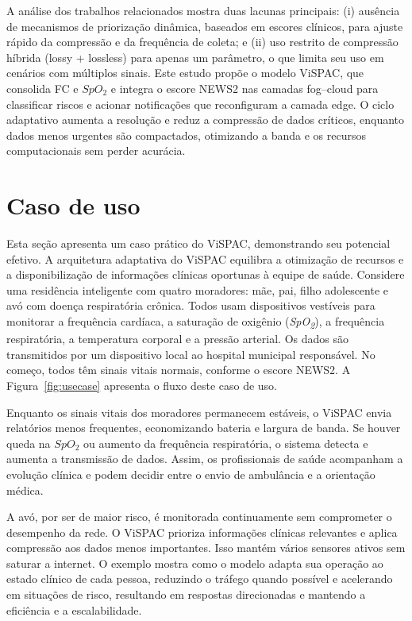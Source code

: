 \documentclass[twoside,english,brazilian]{UNISINOSmonografia}
\begin{document}
A análise dos trabalhos relacionados mostra duas lacunas principais: (i) ausência de mecanismos de priorização dinâmica, baseados em escores clínicos, para ajuste rápido da compressão e da frequência de coleta; e (ii) uso restrito de compressão híbrida (lossy + lossless) para apenas um parâmetro, o que limita seu uso em cenários com múltiplos sinais. Este estudo propõe o modelo ViSPAC, que consolida FC e $SpO_2$ e integra o escore NEWS2 nas camadas fog–cloud para classificar riscos e acionar notificações que reconfiguram a camada edge. O ciclo adaptativo aumenta a resolução e reduz a compressão de dados críticos, enquanto dados menos urgentes são compactados, otimizando a banda e os recursos computacionais sem perder acurácia.

\section{Caso de uso}
Esta seção apresenta um caso prático do ViSPAC, demonstrando seu potencial efetivo. A arquitetura adaptativa do ViSPAC equilibra a otimização de recursos e a disponibilização de informações clínicas oportunas à equipe de saúde. Considere uma residência inteligente com quatro moradores: mãe, pai, filho adolescente e avó com doença respiratória crônica. Todos usam dispositivos vestíveis para monitorar a frequência cardíaca, a saturação de oxigênio (\textit{SpO\textsubscript{2}}), a frequência respiratória, a temperatura corporal e a pressão arterial. Os dados são transmitidos por um dispositivo local ao hospital municipal responsável. No começo, todos têm sinais vitais normais, conforme o escore NEWS2. A Figura~\ref{fig:usecase} apresenta o fluxo deste caso de uso.

Enquanto os sinais vitais dos moradores permanecem estáveis, o ViSPAC envia relatórios menos frequentes, economizando bateria e largura de banda. Se houver queda na $SpO_2$ ou aumento da frequência respiratória, o sistema detecta e aumenta a transmissão de dados. Assim, os profissionais de saúde acompanham a evolução clínica e podem decidir entre o envio de ambulância e a orientação médica.

A avó, por ser de maior risco, é monitorada continuamente sem comprometer o desempenho da rede. O ViSPAC prioriza informações clínicas relevantes e aplica compressão aos dados menos importantes. Isso mantém vários sensores ativos sem saturar a internet. O exemplo mostra como o modelo adapta sua operação ao estado clínico de cada pessoa, reduzindo o tráfego quando possível e acelerando em situações de risco, resultando em respostas direcionadas e mantendo a eficiência e a escalabilidade.
\end{document}
